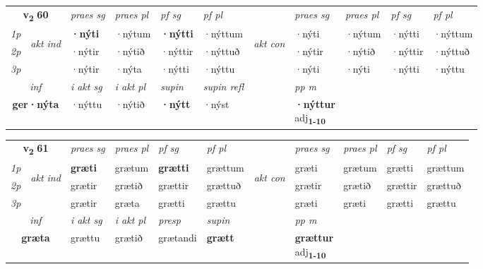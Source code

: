 \noindent
\begin{tabular}{lllllllllll} \toprule
\multicolumn{2}{c}{\textbf{v{\textsubscript{2}}} \Large{\textbf{60}}}  &  \textit{praes sg}  & \textit{praes pl}  &\textit{ pf sg} & \textit{pf pl} &  &  \textit{praes sg}  & \textit{praes pl}  & \textit{pf sg} & \textit{pf pl } \\*
	\cmidrule{3-6} \cmidrule{8-11}
 {\textit{1p}} & \multirow{3}{*}{\begin{turn}{90}\textit{akt ind}\end{turn}} & \textbf{·nýti} & ·nýtum & \textbf{·nýtti} & ·nýttum & \multirow{3}{*}{\begin{turn}{90}\textit{akt con}\end{turn}} &·nýti & ·nýtum & ·nýtti & ·nýttum\\*
 {\textit{2p}} &  &  ·nýtir  & ·nýtið & ·nýttir & ·nýttuð & & ·nýtir & ·nýtið & ·nýttir & ·nýttuð \\*
{\textit{3p}} &  & ·nýtir & ·nýta & ·nýtti & ·nýttu & & ·nýti & ·nýti& ·nýtti & ·nýttu \\*
\cmidrule{3-6} \cmidrule{8-11}

   \multicolumn{2}{c}{\textit{inf}}  & \textit{i akt sg} & \textit{i akt pl}    & \textit{supin} & \textit{supin refl} && \textit{pp m} \\*
  \multicolumn{2}{c}{\textbf{ger\allowbreak ·nýta}} & ·nýttu  & ·nýtið    &  \textbf{·nýtt} & ·nýst && \specialcell{\textbf{·nýttur} \\ adj\textbf{\textsubscript{1-10}}} \\*
\end{tabular}

\noindent
\begin{tabular}{lllllllllll} \toprule
\multicolumn{2}{c}{\textbf{v{\textsubscript{2}}} \Large{\textbf{61}}}  &  \textit{praes sg}  & \textit{praes pl}  &\textit{ pf sg} & \textit{pf pl} &  &  \textit{praes sg}  & \textit{praes pl}  & \textit{pf sg} & \textit{pf pl } \\*
	\cmidrule{3-6} \cmidrule{8-11}
 {\textit{1p}} & \multirow{3}{*}{\begin{turn}{90}\textit{akt ind}\end{turn}} & \textbf{græti} & grætum & \textbf{grætti} & grættum & \multirow{3}{*}{\begin{turn}{90}\textit{akt con}\end{turn}} &græti & grætum & grætti & grættum\\*
 {\textit{2p}} &  &  grætir  & grætið & grættir & grættuð & & grætir & grætið & grættir & grættuð \\*
{\textit{3p}} &  & grætir & græta & grætti & grættu & & græti & græti& grætti & grættu \\*
\cmidrule{3-6} \cmidrule{8-11}

   \multicolumn{2}{c}{\textit{inf}}  & \textit{i akt sg} & \textit{i akt pl}   & \textit{presp} & \textit{supin}  && \textit{pp m} \\*
  \multicolumn{2}{c}{\textbf{græta}} & grættu  & grætið   & grætandi &  \textbf{grætt}  && \specialcell{\textbf{grættur} \\ adj\textbf{\textsubscript{1-10}}} \\*
\end{tabular}

